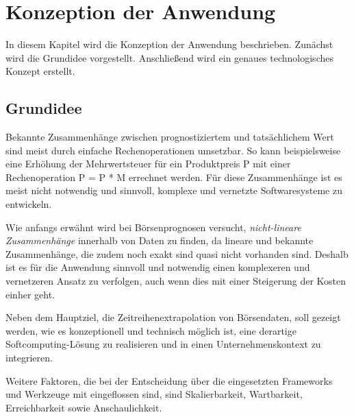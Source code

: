 \chapter{Konzeption der Anwendung}
\label{chapter:Konzeption der Anwendung}

In diesem Kapitel wird die Konzeption der Anwendung beschrieben. Zunächst wird die Grundidee vorgestellt. Anschließend wird ein genaues technologisches Konzept erstellt.

\section{Grundidee} %
\label{section:Grundidee} %
Bekannte Zusammenhänge zwischen prognostiziertem und tatsächlichem Wert sind meist durch einfache Rechenoperationen umsetzbar. So kann beispielsweise eine Erhöhung der Mehrwertsteuer für ein Produktpreis P mit einer Rechenoperation P = P * M errechnet werden. Für diese Zusammenhänge ist es meist nicht notwendig und sinnvoll, komplexe und vernetzte Softwaresysteme zu entwickeln. 

Wie anfangs erwähnt wird bei Börsenprognosen versucht, \emph{nicht-lineare Zusammenhänge} innerhalb von Daten zu finden, da lineare und bekannte Zusammenhänge, die zudem noch exakt sind quasi nicht vorhanden sind. Deshalb ist es für die Anwendung sinnvoll und notwendig einen komplexeren und vernetzeren Ansatz zu verfolgen, auch wenn dies mit einer Steigerung der Kosten einher geht. 

Neben dem Hauptziel, die Zeitreihenextrapolation von Börsendaten, soll gezeigt werden, wie es konzeptionell und technisch möglich ist, eine derartige Softcomputing-Lösung zu realisieren und in einen Unternehmenskontext zu integrieren.

Weitere Faktoren, die bei der Entscheidung über die eingesetzten Frameworks und Werkzeuge mit eingeflossen sind, sind Skalierbarkeit, Wartbarkeit, Erreichbarkeit sowie Anschaulichkeit. 


